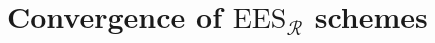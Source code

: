 \documentclass{article} %
\theoremstyle{definition}
\theoremstyle{remark}
\newtheorem{proposition}{Proposition}[section]
\begin{document}
\section{Convergence of \texorpdfstring{$\mathrm{EES}_\mathcal{R}$ schemes}{TEXT}}\label{appendix:convergence}







\end{document}
